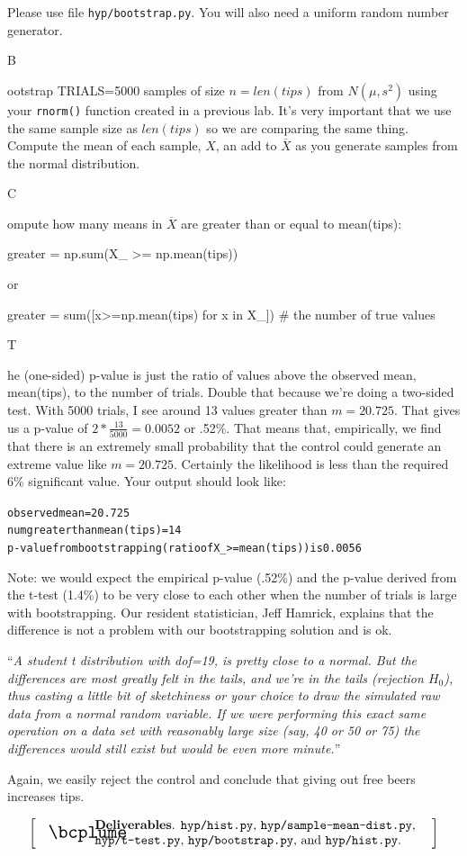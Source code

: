 \documentclass[titlepage]{tufte-book}
\makeatletter
\newcounter{problem}
\newcommand{\step}[1]{{}
\vspace{4pt} \noindent {\bf \theproblem. }#1\addtocounter{problem}{1}}
\newenvironment{callout}[1]{
\[
  \left[
      \begin{tabular}{@{\quad}m{.05\textwidth}@{\qquad}m{.75\textwidth}@{\quad}}
        \scalebox{1.5}{#1} & 
          \raggedright%
}
{
      \end{tabular}
    \right]
\]
}
\makeatother
\begin{document}
\begin{fullwidth}
\item Please use file {\tt hyp/bootstrap.py}. You will also need a uniform random number generator. 

\step Bootstrap TRIALS=5000 samples of size $n=len(tips)$ from $N(\mu, s^2)$ using your {\tt rnorm()} function created in a previous lab. It's very important that we use the same sample size as $len(tips)$ so we are comparing the same thing. Compute the mean of each sample, $X$, an add to $\overline{X}$ as you generate samples from the normal distribution.

\step Compute how many means in $\overline{X}$ are greater than or equal to mean(tips):

\begin{pyverbatim}
greater = np.sum(X_ >= np.mean(tips))
\end{pyverbatim}

or

\begin{pyverbatim}
greater = sum([x>=np.mean(tips) for x in X_]) # the number of true values
\end{pyverbatim}

\step The (one-sided) p-value is just the ratio of values above the observed mean, mean(tips), to the number of trials. Double that because we're doing a two-sided test. With 5000 trials, I see around 13 values greater than $m=20.725$. That gives us a p-value of $2*\frac{13}{5000} = 0.0052$ or .52\%. That means that, empirically, we find that there is an extremely small probability that the control could generate an extreme value like $m=20.725$. Certainly the likelihood is less than the required 6\% significant value.  Your output should look like:

\begin{alltt}
observed mean = 20.725
num greater than mean(tips) = 14
p-value from bootstrapping (ratio of X_ >= mean(tips)) is 0.0056
\end{alltt}

Note: we would expect the empirical p-value (.52\%) and the p-value derived from the t-test (1.4\%) to be very close to each other when the number of trials is large with bootstrapping.  Our resident statistician, Jeff Hamrick, explains that the difference is not a problem with our bootstrapping solution and is ok.

``{\em A student t distribution with dof=19, is pretty close to a normal. But the differences are most greatly felt in the tails, and we're in the tails (rejection $H_{0}$), thus casting a little bit of sketchiness or your choice to draw the simulated raw data from a normal random variable. If we were performing this exact same operation on a data set with reasonably large size (say, 40 or 50 or 75) the differences would still exist but would be even more minute.}''

Again, we easily reject the control and conclude that giving out free beers increases tips.

\begin{callout}{\bcplume}
{\bf Deliverables}. {\tt hyp/hist.py}, {\tt hyp/sample-mean-dist.py}, {\tt hyp/t-test.py}, {\tt hyp/bootstrap.py}, and {\tt hyp/hist.py}.
\end{callout}

\end{fullwidth}
\end{document}
